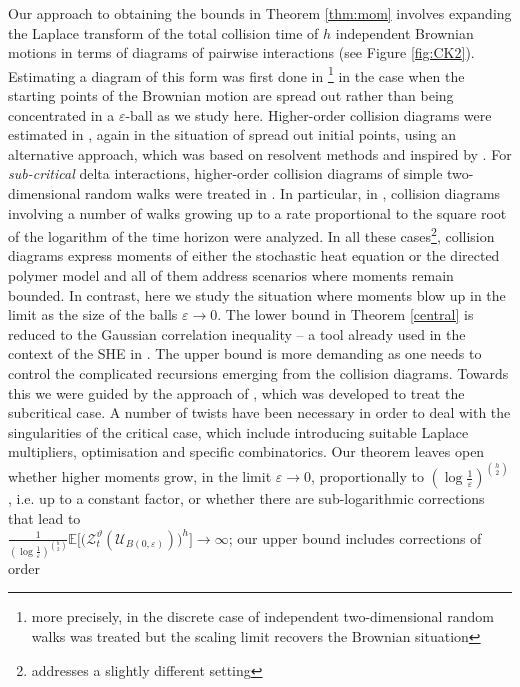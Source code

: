 \documentclass[a4paper,reqno,11pt]{amsart}
\numberwithin{equation}{section}
\theoremstyle{mytheorem}
\newcommand{\bbE}{{\ensuremath{\mathbb E}} }
\newcommand{\cU}{{\ensuremath{\mathcal U}} }
\renewcommand{\epsilon}{\varepsilon}
\renewcommand{\theta}{\vartheta}
\begin{document}
Our approach to obtaining the bounds in Theorem \ref{thm:mom} involves expanding the Laplace
transform of the total collision time of $h$ independent Brownian motions 
in terms of diagrams of pairwise interactions (see Figure \ref{fig:CK2}). Estimating a
diagram of this form was first done in \cite{CSZ19b}\footnote{more precisely, in \cite{CSZ19b} the discrete case of independent two-dimensional random walks was treated but the scaling limit recovers the Brownian situation}
 in the case when the starting points of the Brownian motion  are spread out rather than being
concentrated in a $\epsilon$-ball as we study here. Higher-order collision diagrams were estimated in \cite{GQT21}, again
in the situation of spread out initial points, using an alternative approach, which was
 based on resolvent methods and inspired by  \cite{DFT94, DR04}. For {\it sub-critical} delta interactions,
 higher-order collision diagrams of simple two-dimensional random walks were treated in \cite{CZ23, LZ23, LZ24}. 
In particular, in \cite{CZ23}, collision diagrams involving a number of walks growing up to a rate proportional to the square root of the logarithm of the time horizon were analyzed. In all these cases\footnote{\cite{LZ23} addresses a slightly different setting}, collision diagrams express moments of either the stochastic heat 
 equation or the directed polymer model and all of them address scenarios where moments remain
 bounded. In contrast, here we study the situation where moments blow up in the limit as the size of the balls 
 $\epsilon\to0$. 
 \vskip 2mm
 The lower bound in Theorem \ref{central} is reduced to the Gaussian correlation inequality \cite{R14, LM17} --
 a tool already used in the context of the SHE in \cite{F16, CSZ23b}. The upper bound is more demanding as one needs
 to control the complicated recursions emerging from the collision diagrams. Towards this we were guided by the approach of \cite{CZ23}, which was developed to treat the subcritical case. A number of twists have been necessary in order to deal with the 
 singularities of the critical case, which include introducing suitable Laplace multipliers, optimisation  
 and specific combinatorics.
 \vskip 2mm
 Our theorem leaves open whether higher moments grow, in the limit $\epsilon\to0$, proportionally to
$(\log\tfrac{1}{\epsilon})^{h\choose 2}$, i.e. up to a constant factor,
or whether there are sub-logarithmic corrections that lead to  \\
$\tfrac{1}{(\log \tfrac{1}{\epsilon})^{h\choose 2}}\bbE\Big[ \Big( \mathscr{Z}_{t}^\theta(\cU_{B(0,\epsilon)}) \Big)^h\Big] \to \infty$; our upper bound includes corrections of order 
\end{document}
